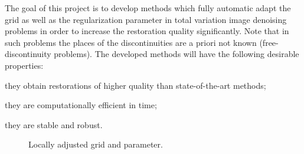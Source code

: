 \documentclass[enabledeprecatedfontcommands,cleardoublepage=empty,headsepline,twoside,11pt,DIV=15,BCOR=12mm,final]{scrartcl}
\begin{document}
 The goal of this project is to develop methods which fully automatic adapt the grid as well as the regularization parameter in total variation image denoising problems in order to increase the restoration quality significantly.  Note that in such problems the places of the discontinuities are a priori not known (free-discontinuity problems). The developed methods will have the following desirable properties: 
\begin{inparaenum}[(i)]
\item they obtain restorations of higher quality than state-of-the-art methods;
\item they are computationally efficient in time;
\item they are stable and robust.
\end{inparaenum}
\begin{figure}
\begin{center}
\hspace{0.3cm}
\hspace{0.3cm}
\caption{Locally adjusted grid and parameter.}\label{fig:lamdba}
\end{center}
\end{figure}
\end{document}

